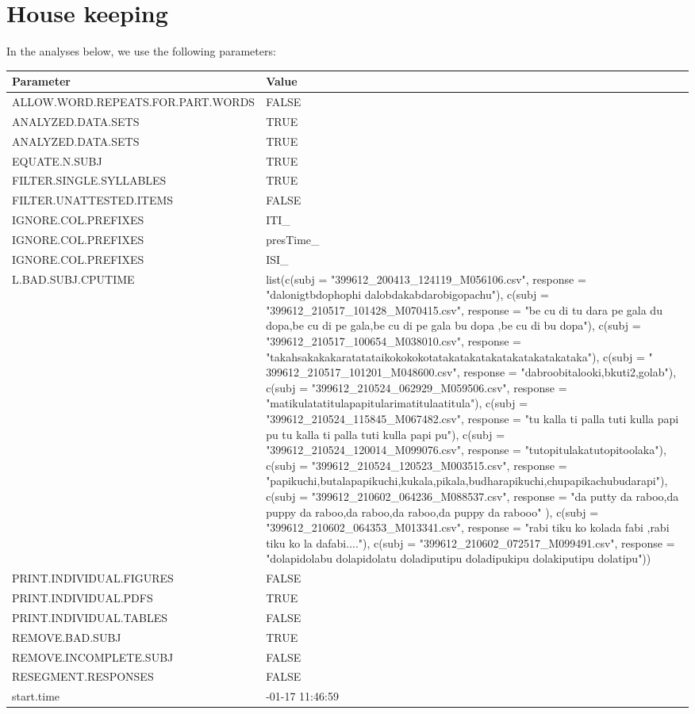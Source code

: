 \documentclass[
]{article}
\begin{document}
\hypertarget{house-keeping}{%
\section{House keeping}\label{house-keeping}}

In the analyses below, we use the following parameters:

\begin{tabular}{>{\raggedright\arraybackslash}p{20em}|>{\raggedright\arraybackslash}p{30em}}
\hline
Parameter & Value\\
\hline
ALLOW.WORD.REPEATS.FOR.PART.WORDS & FALSE\\
\hline
ANALYZED.DATA.SETS & \vphantom{1} TRUE\\
\hline
ANALYZED.DATA.SETS & TRUE\\
\hline
EQUATE.N.SUBJ & TRUE\\
\hline
FILTER.SINGLE.SYLLABLES & TRUE\\
\hline
FILTER.UNATTESTED.ITEMS & FALSE\\
\hline
IGNORE.COL.PREFIXES & ITI\_\\
\hline
IGNORE.COL.PREFIXES & presTime\_\\
\hline
IGNORE.COL.PREFIXES & ISI\_\\
\hline
L.BAD.SUBJ.CPUTIME & list(c(subj = "399612\_200413\_124119\_M056106.csv", response = "dalonigtbdophophi dalobdakabdarobigopachu"), c(subj = "399612\_210517\_101428\_M070415.csv", response = "be cu di tu dara pe gala du dopa,be cu di pe gala,be cu di pe gala bu dopa ,be cu di bu dopa"), c(subj = "399612\_210517\_100654\_M038010.csv", response = "takahsakakakaratatataikokokokotatakatakatakatakatakatakataka"), c(subj = " 399612\_210517\_101201\_M048600.csv", response = "dabroobitalooki,bkuti2,golab"), c(subj = "399612\_210524\_062929\_M059506.csv", 
response = "matikulatatitulapapitularimatitulaatitula"), c(subj = "399612\_210524\_115845\_M067482.csv", response = "tu kalla ti palla tuti kulla papi pu tu kalla ti palla tuti kulla papi pu"), c(subj = "399612\_210524\_120014\_M099076.csv", response = "tutopitulakatutopitoolaka"), c(subj = "399612\_210524\_120523\_M003515.csv", response = "papikuchi,butalapapikuchi,kukala,pikala,budharapikuchi,chupapikachubudarapi"), c(subj = "399612\_210602\_064236\_M088537.csv", response = "da putty da raboo,da puppy da raboo,da raboo,da raboo,da puppy da rabooo"
), c(subj = "399612\_210602\_064353\_M013341.csv", response = "rabi tiku ko kolada fabi ,rabi tiku ko la dafabi...."), c(subj = "399612\_210602\_072517\_M099491.csv", response = "dolapidolabu dolapidolatu doladiputipu doladipukipu dolakiputipu dolatipu"))\\
\hline
PRINT.INDIVIDUAL.FIGURES & FALSE\\
\hline
PRINT.INDIVIDUAL.PDFS & TRUE\\
\hline
PRINT.INDIVIDUAL.TABLES & FALSE\\
\hline
REMOVE.BAD.SUBJ & TRUE\\
\hline
REMOVE.INCOMPLETE.SUBJ & FALSE\\
\hline
RESEGMENT.RESPONSES & FALSE\\
\hline
start.time & 2023-01-17 11:46:59\\
\hline
\end{tabular}
\end{document}
